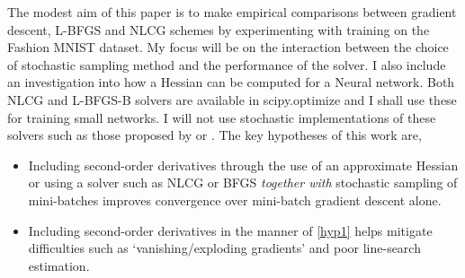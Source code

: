 \documentclass[nohyperref]{article}
\theoremstyle{plain}
\theoremstyle{definition}
\theoremstyle{remark}
\begin{document}
The modest aim of this paper is to make empirical comparisons between gradient descent, L-BFGS and NLCG schemes by experimenting with training on the Fashion MNIST dataset. My focus will be on the interaction between the choice of stochastic sampling method and the performance of the solver. I also include an investigation into how a Hessian can be computed for a  Neural network. Both NLCG and L-BFGS-B solvers are available in scipy.optimize \citep[see][SciPy v1.7.1]{scipy:min} and I shall use these for training small networks. I will not use stochastic implementations of these solvers such as those proposed by \citet{Zhao:SLBFGS} or \citet{Hong:SCGM}. The key hypotheses of this work are, 
\begin{itemize}
\item
Including second-order derivatives through the use of an approximate Hessian or using a solver such as NLCG or BFGS \textit{together with} stochastic sampling of mini-batches improves convergence over mini-batch gradient descent alone.\label{hyp1}
\item
Including second-order derivatives in the manner of \ref{hyp1} helps mitigate difficulties such as `vanishing/exploding gradients' and poor line-search estimation.
\end{itemize}
\end{document}
